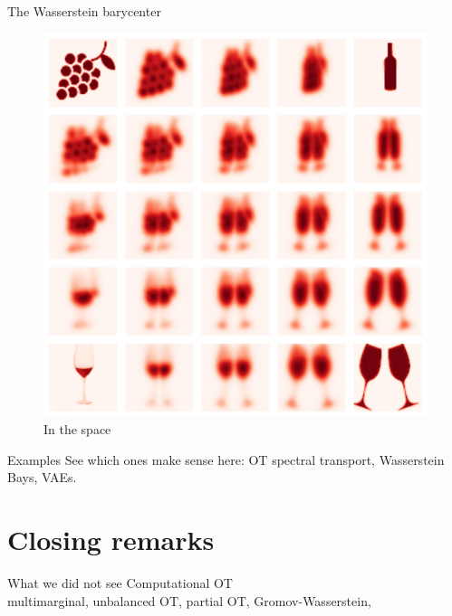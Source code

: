 \documentclass[pdf,aspectratio=169,10pt]{beamer}
\begin{document}
\begin{frame}{The Wasserstein barycenter}
\begin{minipage}{0.48\textwidth}
    \end{minipage}
    \hfill
    \begin{minipage}{0.48\textwidth}
\begin{figure}
            \centering
                \includegraphics[clip, height=0.7\textheight]{../img/symboles_wine_bary.pdf}
            \caption{In the  space}
            \end{figure}
            
        \end{minipage}
\end{frame}


\begin{frame}{Examples}
    See which ones make sense here:  OT spectral transport, Wasserstein Bays, VAEs.
\end{frame}


\section{Closing remarks}

\begin{frame}{What we did not see}
    Computational OT \\
   multimarginal, unbalanced OT, partial OT, Gromov-Wasserstein, 
\end{frame}
\end{document}

